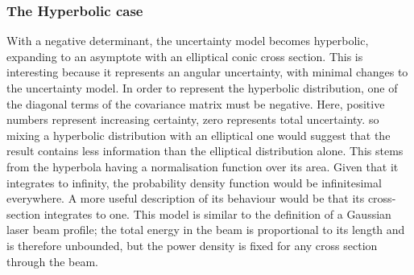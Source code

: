 \documentclass[a4paper, 11pt, titlepage]{article}
\begin{document}
    \subsubsection{The Hyperbolic case}
      \label{sec:hyperbolicCase}
      With a negative determinant, the uncertainty model becomes hyperbolic, expanding to an asymptote with an elliptical conic cross section.  This is interesting because it represents an angular uncertainty, with minimal changes to the uncertainty model.
      In order to represent the hyperbolic distribution, one of the diagonal terms of the covariance matrix must be negative.  Here, positive numbers represent increasing certainty, zero represents total uncertainty.  so mixing a hyperbolic distribution with an elliptical one would suggest that the result contains less information than the elliptical distribution alone.
      This stems from the hyperbola having a normalisation function over its area.  Given that it integrates to infinity, the probability density function would be infinitesimal everywhere.  A more useful description of its behaviour would be that its cross-section integrates to one.
      This model is similar to the definition of a Gaussian laser beam profile; the total energy in the beam is proportional to its length and is therefore unbounded, but the power density is fixed for any cross section through the beam.
\end{document}
